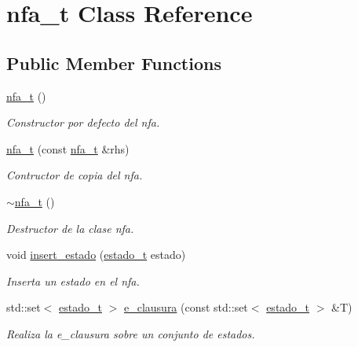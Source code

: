 \hypertarget{classnfa__t}{}\section{nfa\+\_\+t Class Reference}
\label{classnfa__t}
\subsection*{Public Member Functions}
\begin{DoxyCompactItemize}
\item 
\mbox{\label{classnfa__t_a77e5ba78c8b651118d3e87b0ded68268}} 
\hyperlink{classnfa__t_a77e5ba78c8b651118d3e87b0ded68268}{nfa\+\_\+t} ()
\begin{DoxyCompactList}\small\item\em Constructor por defecto del nfa. \end{DoxyCompactList}\item 
\hyperlink{classnfa__t_a1932cce0cf1d97f208a28970853b5c5d}{nfa\+\_\+t} (const \hyperlink{classnfa__t}{nfa\+\_\+t} \&rhs)
\begin{DoxyCompactList}\small\item\em Contructor de copia del nfa. \end{DoxyCompactList}\item 
\mbox{\label{classnfa__t_a4eb866b2b9bc71141d1b085a3ab52cd9}} 
\hyperlink{classnfa__t_a4eb866b2b9bc71141d1b085a3ab52cd9}{$\sim$nfa\+\_\+t} ()
\begin{DoxyCompactList}\small\item\em Destructor de la clase nfa. \end{DoxyCompactList}\item 
void \hyperlink{classnfa__t_aef9354648195e1b8673e4cf74a8d8f24}{insert\+\_\+estado} (\hyperlink{classestado__t}{estado\+\_\+t} estado)
\begin{DoxyCompactList}\small\item\em Inserta un estado en el nfa. \end{DoxyCompactList}\item 
std\+::set$<$ \hyperlink{classestado__t}{estado\+\_\+t} $>$ \hyperlink{classnfa__t_a8d823ef60bb25868b5c768ff54285cce}{e\+\_\+clausura} (const std\+::set$<$ \hyperlink{classestado__t}{estado\+\_\+t} $>$ \&T)
\begin{DoxyCompactList}\small\item\em Realiza la e\+\_\+clausura sobre un conjunto de estados. \end{DoxyCompactList}\item 

\end{DoxyCompactItemize}
